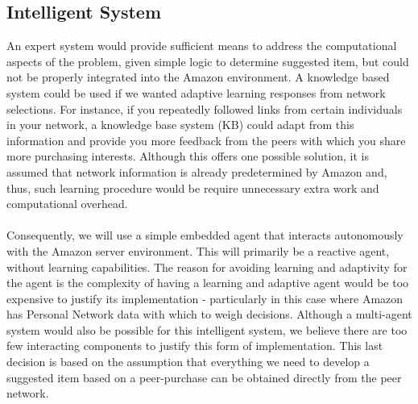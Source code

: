 \documentclass[12pt,a4paper]{article}
\begin{document}
	
	
	\subsection*{Intelligent System}
		An expert system would provide sufficient means to address the computational aspects of the problem, given simple logic to determine suggested item, but could not be properly integrated into the Amazon environment. A knowledge based system could be used if we wanted adaptive learning responses from network selections. For instance, if you repeatedly followed links from certain individuals in your network, a knowledge base system (KB) could adapt from this information and provide you more feedback from the peers with which you share more purchasing interests. Although this offers one possible solution, it is assumed that network information is already predetermined by Amazon and, thus, such learning procedure would be require unnecessary extra work and computational overhead. 
		\\\\
		Consequently, we will use a simple embedded agent that interacts autonomously with the Amazon server environment. This will primarily be a reactive agent, without learning capabilities. The reason for avoiding learning and adaptivity for the agent is the complexity of having a learning and adaptive agent would be too expensive to justify its implementation - particularly in this case where Amazon has Personal Network data with which to weigh decisions. Although a multi-agent system would also be possible for this intelligent system, we believe there are too few interacting components to justify this form of implementation. This last decision is based on the assumption that everything we need to develop a suggested item based on a peer-purchase can be obtained directly from the peer network. 
		\\\\
\end{document}
